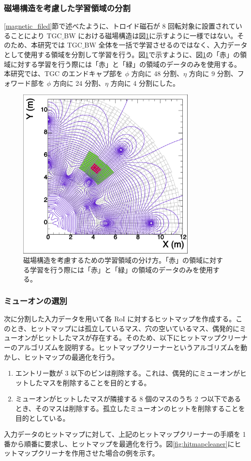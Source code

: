 \subsubsection{磁場構造を考慮した学習領域の分割}
\ref{magnetic_filed}節で述べたように、トロイド磁石が 8 回転対象に設置されていることにより TGC$\_$BW における磁場構造は図\ref{fig:Mag}に示すように一様ではない。そのため、本研究では TGC$\_$BW 全体を一括で学習させるのではなく、入力データとして使用する領域を分割して学習を行う。図\ref{fig:Mag}で示すように、図\ref{fig:Mag}の「赤」の領域に対する学習を行う際には「赤」と「緑」の領域のデータのみを使用する。
本研究では、TGC のエンドキャプ部を $\phi$ 方向に 48 分割、$\eta$ 方向に 9 分割、フォワード部を $\phi$ 方向に 24 分割、$\eta$ 方向に 4 分割にした。
\begin{figure}[tb]
  \centering
  \includegraphics[clip, width=9cm]{fig/4/c1_withMag.pdf}
  \caption{磁場構造を考慮するための学習領域の分け方。「赤」の領域に対する学習を行う際には「赤」と「緑」の領域のデータのみを使用する。}
  \label{fig:Mag}
\end{figure}

\subsubsection{ミューオンの選別}
次に分割した入力データを用いて各 RoI に対するヒットマップを作成する。このとき、ヒットマップには孤立しているマス、穴の空いているマス、偶発的にミューオンがヒットしたマスが存在する。そのため、以下にヒットマップクリーナーのアルゴリズムを説明する。ヒットマップクリーナーというアルゴリズムを動かし、ヒットマップの最適化を行う。
\begin{enumerate}
   \item エントリー数が 3 以下のビンは削除する。これは、偶発的にミューオンがヒットしたマスを削除することを目的とする。
   \item ミューオンがヒットしたマスが隣接する 8 個のマスのうち 2 つ以下であるとき、そのマスは削除する。孤立したミューオンのヒットを削除することを目的としている。
\end{enumerate}
入力データのヒットマップに対して、上記のヒットマップクリーナーの手順を 1 番から順番に要求し、ヒットマップを最適化を行う。図\ref{fig:hitmapcleaner}にヒットマップクリーナを作用させた場合の例を示す。

